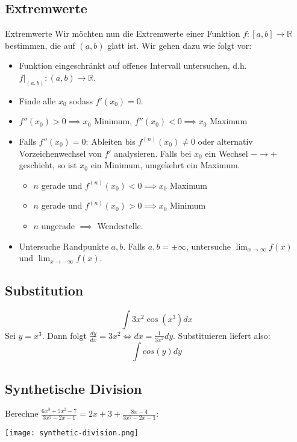 \documentclass[a4paper,10pt]{article}
\begin{document}
\subsection{Extremwerte}
\begin{subbox}{Extremwerte}
  Wir möchten nun die Extremwerte einer Funktion $f: [a, b] \to \mathbb{R}$ bestimmen, die auf $(a, b)$ glatt ist. Wir gehen dazu wie folgt vor:
  \begin{itemize}
    \item Funktion eingeschränkt auf offenes Intervall untersuchen, d.h. $f|_{(a,b)}: (a, b) \to \mathbb{R}$.
    \item Finde alle $x_0$ sodass $f'(x_0) = 0$.
    \item $f''(x_0) > 0 \implies x_0$ Minimum, $f''(x_0) < 0 \implies x_0$ Maximum
    \item Falls $f''(x_0) = 0$: Ableiten bis $f^{(n)}(x_0) \neq 0$ oder alternativ Vorzeichenwechsel von $f'$ analysieren. Falls bei $x_0$ ein Wechsel $- \to +$ geschieht, so ist $x_0$ ein Minimum, umgekehrt ein Maximum. {
      \begin{itemize}
        \item $n$ gerade und $f^{(n)}(x_0) < 0 \implies x_0$ Maximum
        \item $n$ gerade und $f^{(n)}(x_0) > 0 \implies x_0$ Minimum
        \item $n$ ungerade $\implies$ Wendestelle.
      \end{itemize} 
    }
    \item Untersuche Randpunkte $a, b$. Falls $a, b = \pm \infty$, untersuche $\lim_{x \to \infty} f(x)$ und $\lim_{x \to -\infty} f(x)$.
  \end{itemize}
\end{subbox}

\subsection{Substitution}
$$\int 3x^2 \cos(x^3) dx$$
Sei $y = x^3$. Dann folgt $\frac{dy}{dx} = 3x^2 \iff dx = \frac{1}{3x^2} dy$. Substituieren liefert also:
$$\int cos(y) dy$$

\subsection{Synthetische Division}
Berechne $\frac{6x^3 + 5x^2 - 7}{3x^2 - 2x - 1} = 2x + 3 + \frac{8x - 4}{3x^2 -2x - 1}$:\\
\begin{center}
  \texttt{[image: synthetic-division.png]}
\end{center}
\end{document}
